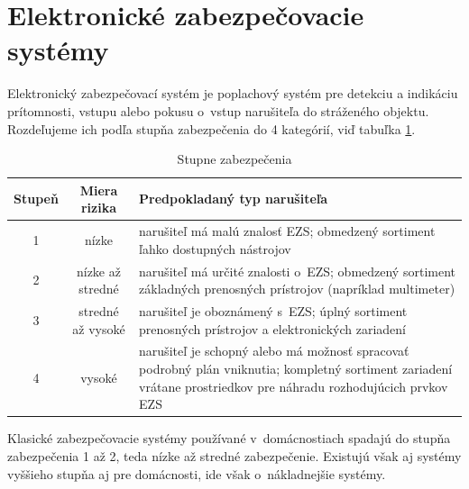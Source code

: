 \section{Elektronické zabezpečovacie systémy}

Elektronický zabezpečovací systém je poplachový systém pre detekciu a indikáciu prítomnosti, vstupu alebo pokusu o~vstup narušiteľa do stráženého objektu. Rozdeľujeme ich podľa stupňa zabezpečenia do 4 kategórií, viď tabuľka \ref{tab:stupenzabezpecenia}.
\begin{table}[ht]
    \centering
    \renewcommand{\arraystretch}{1.5}
    \begin{tabular}{|c|c|p{8cm}|}
        \hline
        \textbf{Stupeň} & \textbf{Miera rizika} & \textbf{Predpokladaný typ narušiteľa}\\ \hline
        1& nízke & narušiteľ má malú znalosť EZS; obmedzený sortiment ľahko dostupných nástrojov\\ \hline
        2 & nízke až stredné &narušiteľ má určité znalosti o~EZS; obmedzený sortiment základných prenosných prístrojov (napríklad multimeter)\\ \hline
        3 & stredné až vysoké & narušiteľ je oboznámený s~EZS; úplný sortiment prenosných prístrojov a elektronických zariadení \\ \hline
        4 & vysoké & narušiteľ je schopný alebo má možnosť spracovať podrobný plán vniknutia; kompletný sortiment zariadení vrátane prostriedkov pre náhradu rozhodujúcich prvkov EZS\\ \hline
    \end{tabular}
    \caption[Stupne zabezpečenia]{Stupne zabezpečenia\cite{csn-en-50131-1}\cite{Krecek}}
    \label{tab:stupenzabezpecenia}
\end{table}

Klasické zabezpečovacie systémy používané v~domácnostiach spadajú do stupňa zabezpečenia 1 až 2, teda nízke až stredné zabezpečenie. Existujú však aj systémy vyššieho stupňa aj pre domácnosti, ide však o~nákladnejšie systémy.

